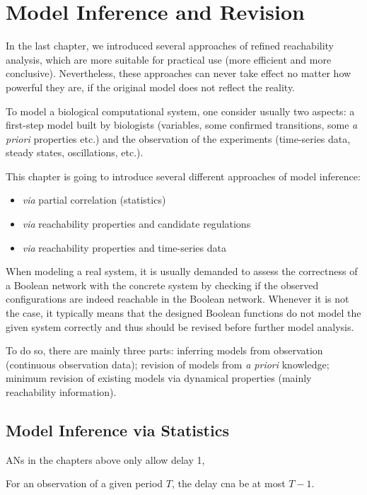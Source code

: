 \chapter{Model Inference and Revision}
\begin{mybox}
In the last chapter, we introduced several approaches of refined reachability analysis, which are more suitable for practical use (more efficient and more conclusive).
Nevertheless, these approaches can never take effect no matter how powerful they are, if the original model does not reflect the reality.

To model a biological computational system, one consider usually two aspects: a first-step model built by biologists (variables, some confirmed transitions, some \textit{a priori} properties etc.) and the observation of the experiments (time-series data, steady states, oscillations, etc.).

This chapter is going to introduce several different approaches of model inference: 
\begin{itemize}
    \item \textit{via} partial correlation (statistics)
    \item \textit{via} reachability properties and candidate regulations
    \item \textit{via} reachability properties and time-series data
\end{itemize}
\end{mybox}

When modeling a real system, it is usually demanded to assess the correctness of a Boolean network with the concrete system by checking if the observed configurations are indeed reachable in the Boolean network.
Whenever it is not the case, it typically means that the designed Boolean functions do not model the given system correctly and thus should be revised before further model analysis.

To do so, there are mainly three parts: inferring models from observation (continuous observation data); revision of models from \textit{a priori} knowledge; minimum revision of existing models via dynamical properties (mainly reachability information).

\section{Model Inference via Statistics}
ANs in the chapters above only allow delay 1,

For an observation of a given period $T$, the delay cna be at most $T-1$.
